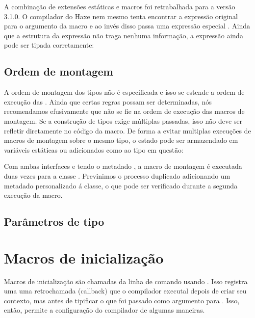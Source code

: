 \begin{itemize}
\begin{itemize}

A combinação de extensões estáticas e macros foi retrabalhada para a versão 3.1.0. O compilador do Haxe nem mesmo tenta encontrar a expressão original para o argumento da macro e ao invés disso passa uma expressão especial . Ainda que a estrutura da expressão não traga nenhuma informação, a expressão ainda pode ser tipada corretamente:





\subsection{Ordem de montagem}
\label{macro-limitations-build-order}

A ordem de montagem dos tipos não é especificada e isso se estende a ordem de execução das  . Ainda que certas regras possam ser determinadas, nós recomendamos efusivamente que não se fie na ordem de execução das macros de montagem. Se a construção de tipos exige múltiplas passadas, isso não deve ser refletir diretamente no código da macro. De forma a evitar multiplas execuções de macros de montagem sobre o mesmo tipo, o estado pode ser armazendado em variáveis estáticas ou adicionados como  ao tipo em questão:


Com ambas interfaces  e  tendo o metadado , a macro de montagem é executada duas vezes para a classe . Previnimos o processo duplicado adicionando um metadado personalizado  á classe, o que pode ser verificado durante a segunda execução da macro.


\subsection{Parâmetros de tipo}
\label{macro-limitations-type-parameters}


\section{Macros de inicialização}
\label{macro-initialization}

Macros de inicialização são chamadas da linha de comando usando . Isso registra uma uma retrochamada (callback) que o compilador executal depois de criar seu contexto, mas antes de tipificar o que foi passado como argumento para . Isso, então, permite a configuração do compilador de algumas maneiras.


\end{itemize}
\end{itemize}
